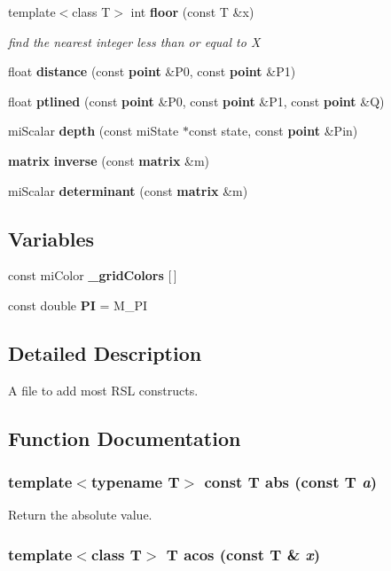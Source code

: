 \begin{CompactItemize}
template$<$class T$>$ int {\bf floor} (const T \&x)
\begin{CompactList}\small\item\em find the nearest integer less than or equal to X \item\end{CompactList}\item 
float {\bf distance} (const {\bf point} \&P0, const {\bf point} \&P1)
\item 
float {\bf ptlined} (const {\bf point} \&P0, const {\bf point} \&P1, const {\bf point} \&Q)
\item 
mi\-Scalar {\bf depth} (const mi\-State $\ast$const state, const {\bf point} \&Pin)
\item 
{\bf matrix} {\bf inverse} (const {\bf matrix} \&m)
\item 
mi\-Scalar {\bf determinant} (const {\bf matrix} \&m)
\end{CompactItemize}
\subsection*{Variables}
\begin{CompactItemize}
\item 
const mi\-Color {\bf \_\-grid\-Colors} [$\,$]
\item 
const double {\bf PI} = M\_\-PI
\end{CompactItemize}


\subsection{Detailed Description}
A file to add most RSL constructs. 



\subsection{Function Documentation}
\subsubsection{\setlength{\rightskip}{0pt plus 5cm}template$<$typename T$>$ const T abs (const T {\em a})\hspace{0.3cm}{\tt  [inline]}}\label{namespacersl_a3}


Return the absolute value. 

\subsubsection{\setlength{\rightskip}{0pt plus 5cm}template$<$class T$>$ T acos (const T \& {\em x})\hspace{0.3cm}{\tt  [inline]}}\label{namespacersl_a27}


